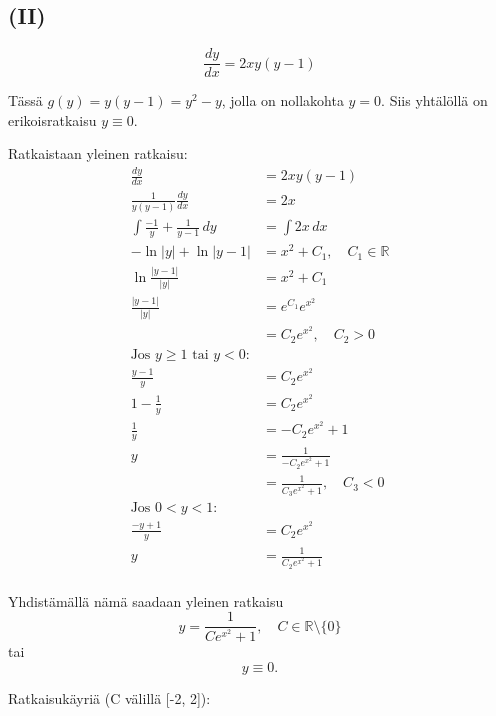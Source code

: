 \documentclass{article}
\begin{document}
\subsection*{(II)}

\[
  \frac{dy}{dx} = 2xy(y - 1)
\]

Tässä $g(y) = y(y - 1) = y^2 - y$, jolla on nollakohta $y = 0$.
Siis yhtälöllä on erikoisratkaisu $y \equiv 0$.

Ratkaistaan yleinen ratkaisu:
\begin{align*}
  \frac{dy}{dx} &= 2xy(y - 1) \\
  \frac{1}{y(y - 1)}\frac{dy}{dx} &= 2x \\
  \int \frac{-1}{y} + \frac{1}{y - 1}\,dy &= \int 2x\,dx \\
  -\ln |y| + \ln |y - 1| &= x^2 + C_1, \quad C_1 \in \mathbb{R} \\
  \ln \frac{|y - 1|}{|y|} &= x^2 + C_1 \\
  \frac{|y - 1|}{|y|} &= e^{C_1}e^{x^2} \\
                      &= C_2e^{x^2}, \quad C_2 > 0 \\
  \text{Jos $y \geq 1$ tai $y < 0$:} \\
  \frac{y - 1}{y} &= C_2e^{x^2} \\
  1 - \frac{1}{y} &= C_2e^{x^2} \\
  \frac{1}{y} &= -C_2e^{x^2} + 1 \\
  y &= \frac{1}{-C_2e^{x^2} + 1} \\
    &= \frac{1}{C_3e^{x^2} + 1}, \quad C_3 < 0 \\
  \text{Jos $0 < y < 1$:} \\
  \frac{-y + 1}{y} &= C_2e^{x^2} \\
  y &= \frac{1}{C_2e^{x^2} + 1} \\
\end{align*}

Yhdistämällä nämä saadaan yleinen ratkaisu
\[
  y = \frac{1}{Ce^{x^2} + 1}, \quad C \in \mathbb{R} \setminus \{0\}
\]
tai
\[
  y \equiv 0.
\]

Ratkaisukäyriä (C välillä [-2, 2]):

\begin{center}
\end{center}
\end{document}
